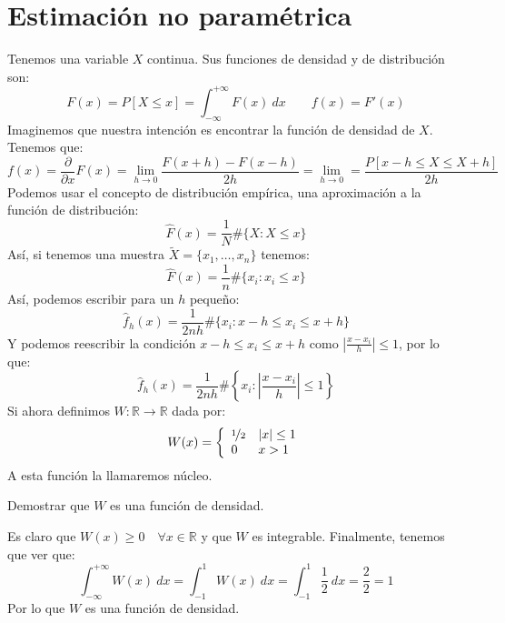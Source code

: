 \section{Estimación no paramétrica} %
\noindent
Tenemos una variable $X$ continua. Sus funciones de densidad y de distribución son:
\begin{equation*}
    F(x) = P[X\leq x] = \int_{-\infty}^{+\infty} F(x)~dx \qquad f(x) = F'(x)
\end{equation*}
Imaginemos que nuestra intención es encontrar la función de densidad de $X$. Tenemos que:
\begin{equation*}
    f(x) = \frac{\partial }{\partial x}F(x) = \lim_{h\to 0} \frac{F(x+h)-F(x-h)}{2h} = \lim_{h\to 0} =  \frac{P[x-h\leq X \leq X+h]}{2h}
\end{equation*}
Podemos usar el concepto de distribución empírica, una aproximación a la función de distribución:
\begin{equation*}
    \hat{F}(x) = \frac{1}{N} \# \{X : X\leq x\}
\end{equation*}
Así, si tenemos una muestra $\tilde{X} = \{x_1, \ldots, x_n\}$ tenemos:
\begin{equation*}
    \hat{F}(x) = \frac{1}{n} \# \{x_i : x_i\leq x\}
\end{equation*}
Así, podemos escribir para un $h$ pequeño:
\begin{equation*}
    \hat{f}_h(x) = \frac{1}{2nh} \# \{x_i : x-h\leq x_i \leq x+h\}
\end{equation*}
Y podemos reescribir la condición $x-h\leq x_i\leq x+h$ como $\left|\frac{x-x_i}{h}\right|\leq 1$, por lo que:
\begin{equation*}
    \hat{f}_h(x) = \frac{1}{2nh}\# \left\{x_i :\left|\frac{x-x_i}{h}\right|\leq 1 \right\}
\end{equation*}
Si ahora definimos $W:\mathbb{R}\to\mathbb{R}$ dada por:
\begin{equation*}
    W(x) = \left\{\begin{array}{ll}
            \nicefrac{1}{2} & |x| \leq 1 \\
            0 & x > 1
    \end{array}\right.
\end{equation*}
A esta función la llamaremos núcleo.
\begin{ejercicio}
    Demostrar que $W$ es una función de densidad.

    \noindent
    Es claro que $W(x)\geq 0\quad \forall x\in \mathbb{R}$ y que $W$ es integrable. Finalmente, tenemos que ver que:
    \begin{equation*}
        \int_{-\infty}^{+\infty} W(x)~dx  = \int_{-1}^{1} W(x)~dx  = \int_{-1}^{1} \frac{1}{2}~dx  = \frac{2}{2} = 1
    \end{equation*}
    Por lo que $W$ es una función de densidad.
\end{ejercicio}
